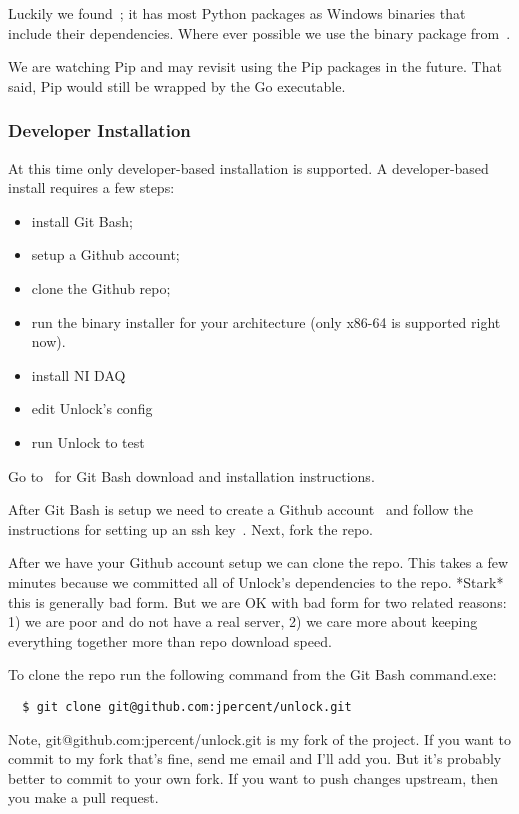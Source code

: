 \documentclass[11pt]{article}
\begin{document}
Luckily we found~\cite{winpythonpackages}; it has most Python packages as Windows binaries that include their dependencies.  Where ever possible we use the binary package from~\cite{winpythonpackages}.  

We are watching Pip and may revisit using the Pip packages in the future.  That said, Pip would still be wrapped by the Go executable.

\subsubsection{Developer Installation}\label{developerinstallsec}

At this time only developer-based installation is supported.  A developer-based install requires a few steps:
\begin{itemize}
\item install Git Bash;
\item setup a Github account;
\item clone the Github repo;
\item run the binary installer for your architecture (only x86-64 is supported right now).
\item install NI DAQ
\item edit Unlock's config
\item run Unlock to test
\end{itemize}

Go to~\cite{gitbash} for Git Bash download and installation instructions.  

After Git Bash is setup we need to create a Github account~\cite{github} and follow the instructions for setting up an ssh key~\cite{sshkey}.  Next, fork the repo.

After we have your Github account setup we can clone the repo.  This takes a few minutes because we committed all of Unlock's dependencies to the repo.  *Stark* this is generally bad form.  But we are OK with bad form for two related reasons: 1) we are poor and do not have a real server, 2) we care more about keeping everything together more than repo download speed.

To clone the repo run the following command from the Git Bash command.exe:
\begin{verbatim}  
  $ git clone git@github.com:jpercent/unlock.git
\end{verbatim}

Note, git@github.com:jpercent/unlock.git is my fork of the project.  If you want to commit to my fork that's fine, send me email and I'll add you.  But it's probably better to commit to your own fork.  If you want to push changes upstream, then you make a pull request.  
\end{document}
